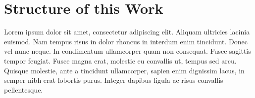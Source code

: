 
\section{Structure of this Work}

Lorem ipsum dolor sit amet, consectetur adipiscing elit. Aliquam ultricies lacinia euismod. Nam tempus risus in dolor rhoncus in interdum enim tincidunt. Donec vel nunc neque. In condimentum ullamcorper quam non consequat. Fusce sagittis tempor feugiat. Fusce magna erat, molestie eu convallis ut, tempus sed arcu. Quisque molestie, ante a tincidunt ullamcorper, sapien enim dignissim lacus, in semper nibh erat lobortis purus. Integer dapibus ligula ac risus convallis pellentesque.